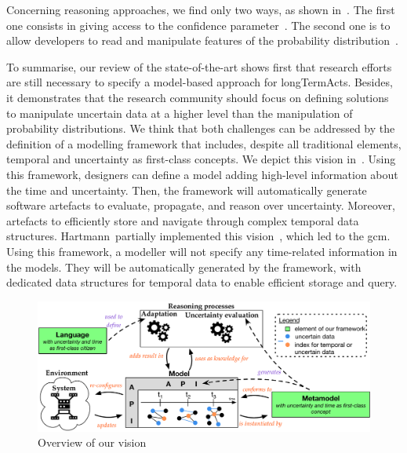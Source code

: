 Concerning reasoning approaches, we find only two ways, as shown in~.
The first one consists in giving access to the confidence parameter~\cite{DBLP:conf/models/BurguenoBMV18, DBLP:conf/ecmdafa/BertoaMBBTV18, DBLP:conf/sle/MayerhoferWV16, DBLP:conf/quatic/VallecilloMO16, DBLP:journals/tkde/BarbaraGP92, DBLP:conf/uist/SchwarzMH11}.
The second one is to allow developers to read and manipulate features of the probability distribution~\cite{baudin2017openturns, DBLP:conf/asplos/BornholtMM14, DBLP:journals/corr/BorgstromGGMG13, osti_1430202, DBLP:journals/peerj-cs/SalvatierWF16, DBLP:conf/popl/BhatAVG12, DBLP:conf/aistats/ChagantyNR13, DBLP:journals/siamsc/JaroszewiczK12, DBLP:journals/toplas/ParkPT08, DBLP:conf/ijcai/Pfeffer01, DBLP:conf/popl/RamseyP02, DBLP:conf/pldi/SankaranarayananCG13, DBLP:conf/icra/Thrun00, DBLP:journals/sac/LunnTBS00, plummer2003jags}.

To summarise, our review of the state-of-the-art shows first that research efforts are still necessary to specify a model-based approach for \glspl{longTermAct}.
Besides, it demonstrates that the research community should focus on defining solutions to manipulate uncertain data at a higher level than the manipulation of probability distributions.
We think that both challenges can be addressed by the definition of a modelling framework that includes, despite all traditional elements, temporal and uncertainty as first-class concepts.
We depict this vision in~.
Using this framework, designers can define a model adding high-level information about the time and uncertainty.
Then, the framework will automatically generate software artefacts to evaluate, propagate, and reason over uncertainty.
Moreover, artefacts to efficiently store and navigate through complex temporal data structures.
Hartmann~\etal partially implemented this vision~\cite{DBLP:journals/is/HartmannFMRT19}, which led to the \gls{gcm}. 
Using this framework, a modeller will not specify any time-related information in the models.
They will be automatically generated by the framework, with dedicated data structures for temporal data to enable efficient storage and query.

\begin{figure}
	\centering
	\includegraphics[width=0.95\linewidth]{img/chapt-vision/vision}
	\caption{Overview of our vision}
	\label{fig:vision:vision}
\end{figure}

